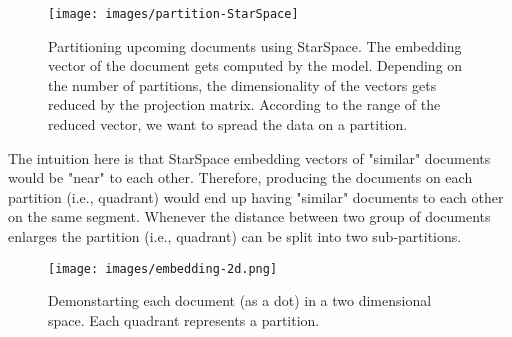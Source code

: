 \begin{figure}[!htb]
    \centering
    \texttt{[image: images/partition-StarSpace]}
    \caption{Partitioning upcoming documents using StarSpace. The embedding vector of the document gets computed by the model. Depending on the number of partitions, the dimensionality of the vectors gets reduced by the projection matrix. According to the range of the reduced vector, we want to spread the data on a partition.}
    \label{fig:star-space-partitioning-process}
\end{figure}


The intuition here is that StarSpace embedding vectors of "similar" documents would be "near" to each other. Therefore, producing the documents on each partition (i.e., quadrant) would end up having "similar" documents to each other on the same segment. Whenever the distance between two group of documents enlarges the partition (i.e., quadrant) can be split into two sub-partitions.


\begin{figure}[!htb]
    \centering
    \texttt{[image: images/embedding-2d.png]}
    \caption{Demonstarting each document (as a dot) in a two dimensional space. Each quadrant represents a partition.}
    \label{fig:embedding-space}
\end{figure}


